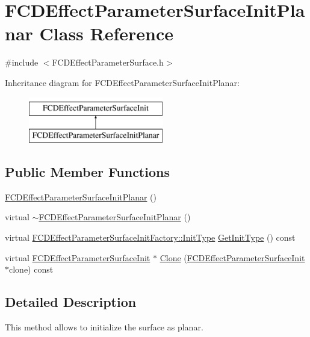 \hypertarget{classFCDEffectParameterSurfaceInitPlanar}{
\section{FCDEffectParameterSurfaceInitPlanar Class Reference}
\label{classFCDEffectParameterSurfaceInitPlanar}
}


{\ttfamily \#include $<$FCDEffectParameterSurface.h$>$}

Inheritance diagram for FCDEffectParameterSurfaceInitPlanar:\begin{figure}[H]
\begin{center}
\leavevmode
\includegraphics[height=2.000000cm]{classFCDEffectParameterSurfaceInitPlanar}
\end{center}
\end{figure}
\subsection*{Public Member Functions}
\begin{DoxyCompactItemize}
\item 
\hyperlink{classFCDEffectParameterSurfaceInitPlanar_a8ce39fa32d458f71da29f83a69ec7329}{FCDEffectParameterSurfaceInitPlanar} ()
\item 
virtual \hyperlink{classFCDEffectParameterSurfaceInitPlanar_ae29ed97f2de4463e47b8354338db5b44}{$\sim$FCDEffectParameterSurfaceInitPlanar} ()
\item 
virtual \hyperlink{classFCDEffectParameterSurfaceInitFactory_a65e74f1159865702cac5236dd5d83892}{FCDEffectParameterSurfaceInitFactory::InitType} \hyperlink{classFCDEffectParameterSurfaceInitPlanar_a9e91a455acbcbed40b8e647aa0c56d80}{GetInitType} () const 
\item 
virtual \hyperlink{classFCDEffectParameterSurfaceInit}{FCDEffectParameterSurfaceInit} $\ast$ \hyperlink{classFCDEffectParameterSurfaceInitPlanar_a565047eceb428bb55f32c7522c39354e}{Clone} (\hyperlink{classFCDEffectParameterSurfaceInit}{FCDEffectParameterSurfaceInit} $\ast$clone) const 
\end{DoxyCompactItemize}


\subsection{Detailed Description}
This method allows to initialize the surface as planar. 


